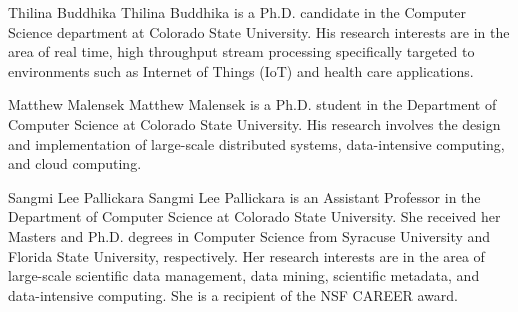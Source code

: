 \documentclass[9pt,journal,compsoc]{IEEEtran}
\begin{document}


\vspace*{-5\baselineskip}
\begin{IEEEbiography}{Thilina Buddhika}
Thilina Buddhika is a Ph.D. candidate in the Computer Science department at Colorado State University.  His research interests are in the area of real time, high throughput stream processing specifically targeted to environments such as Internet of Things (IoT) and health care applications.
\end{IEEEbiography}
\vspace{-2cm}
\begin{IEEEbiography}{Matthew Malensek}
Matthew Malensek is a Ph.D. student in the Department of Computer Science at Colorado State University. His research involves the design and implementation of large-scale distributed systems, data-intensive computing, and cloud computing.
\end{IEEEbiography}
%
\vspace{-2cm}
\begin{IEEEbiography}{Sangmi Lee Pallickara}
Sangmi Lee Pallickara is an Assistant Professor in the Department of Computer Science at Colorado State University. She received her Masters and Ph.D. degrees in Computer Science from Syracuse University and Florida State University, respectively. Her research interests are in the area of large-scale scientific data management, data mining, scientific metadata, and data-intensive computing. She is a recipient of the NSF CAREER award.
\end{IEEEbiography}
\end{document}
